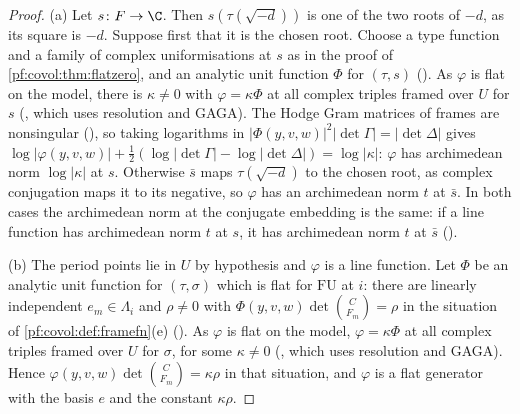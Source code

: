 \begin{proof}
(a) Let $s\colon F\to\C$. Then $s(\tau(\sqrt{-d}))$ is one of the two roots of $-d$, as its square is $-d$. Suppose first that it is the
chosen root. Choose a type function and a family of complex uniformisations at $s$ as in the proof of
\cref{pf:covol:thm:flatzero}, and an analytic unit function $\Phi$ for $(\tau,s)$
(). As $\varphi$ is flat on the model, there is
$\kappa\ne0$ with $\varphi=\kappa\Phi$ at all complex triples framed over $U$ for $s$
(, which uses resolution and GAGA). The Hodge Gram
matrices of frames are nonsingular
(), so taking logarithms in
$|\Phi(y,v,w)|^2|\det\Gamma|=|\det\Delta|$ gives
$\log|\varphi(y,v,w)|+\frac12(\log|\det\Gamma|-\log|\det\Delta|)=\log|\kappa|$: $\varphi$ has archimedean norm
$\log|\kappa|$ at $s$. Otherwise $\bar s$ maps $\tau(\sqrt{-d})$ to the chosen root, as complex conjugation
maps it to its negative, so $\varphi$ has an archimedean norm $t$ at $\bar s$. In both cases the archimedean
norm at the conjugate embedding is the same: if a line function has archimedean norm $t$ at $s$, it has
archimedean norm $t$ at $\bar s$ ().

(b) The period points lie in $U$ by hypothesis and $\varphi$ is a line function. Let $\Phi$ be an analytic
unit function for $(\tau,\sigma)$ which is flat for $\mathrm{FU}$ at $i$: there are linearly independent
$e_m\in\Lambda_i$ and $\rho\ne0$ with $\Phi(y,v,w)\det\binom{C}{F_m}=\rho$ in the situation of
\cref{pf:covol:def:framefn}(e) (). As $\varphi$ is flat
on the model, $\varphi=\kappa\Phi$ at all complex triples framed over $U$ for $\sigma$, for some $\kappa\ne0$
(, which uses resolution and GAGA). Hence
$\varphi(y,v,w)\det\binom{C}{F_m}=\kappa\rho$ in that situation, and $\varphi$ is a flat generator with the
basis $e$ and the constant $\kappa\rho$.
\end{proof}

